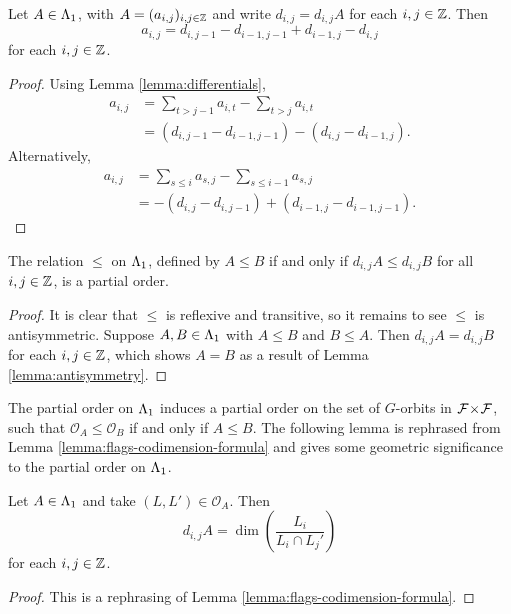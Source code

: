 \documentclass[a4paper, 11pt]{report}
\begin{document}
\begin{lemma}\label{lemma:antisymmetry}
Let $A\in{\Lambda_1}$, with $A = (a_{i,j})_{i,j\in\mathbb{Z}}$ and write $d_{i,j}=d_{i,j}A$ for each $i,j\in\mathbb{Z}$. Then
\begin{equation*}
a_{i,j} = d_{i,j-1} - d_{i-1,j-1} + d_{i-1,j} - d_{i,j}
\end{equation*}
for each $i,j\in\mathbb{Z}$.
\end{lemma}
\begin{proof}
Using Lemma \ref{lemma:differentials},
\begin{align*}
a_{i,j}
&= \sum_{t>j-1}a_{i,t} - \sum_{t>j}a_{i,t}\\
&= (d_{i,j-1} - d_{i-1,j-1}) - (d_{i,j} - d_{i-1,j}).
\end{align*}
Alternatively,
\begin{align*}
a_{i,j}
&= \sum_{s\le i}a_{s,j} - \sum_{s\le i-1}a_{s,j}\\
&= -(d_{i,j}-d_{i,j-1}) + (d_{i-1,j} - d_{i-1,j-1}).
\end{align*}
\end{proof}

\begin{lemma}\label{lemma:orbit-poset}
The relation $\le$ on ${\Lambda_1}$, defined by $A\le B$ if and only if $d_{i,j}A\le d_{i,j}B$ for all $i,j\in\mathbb{Z}$, is a partial order.
\end{lemma}

\begin{proof}
It is clear that $\le$ is reflexive and transitive, so it remains to see $\le$ is antisymmetric. Suppose $A,B\in{\Lambda_1}$ with $A\le B$ and $B\le A$. Then $d_{i,j}A = d_{i,j}B$ for each $i,j\in\mathbb{Z}$, which shows $A=B$ as a result of Lemma \ref{lemma:antisymmetry}.  
\end{proof}

The partial order on ${\Lambda_1}$ induces a partial order on the set of $G$-orbits in ${\mathcal{F}\!\times\!\mathcal{F}}$, such that $\mathcal{O}_A\le \mathcal{O}_B$ if and only if $A\le B$. The following lemma is rephrased from Lemma \ref{lemma:flags-codimension-formula} and gives some geometric significance to the partial order on ${\Lambda_1}$.

\begin{lemma}
Let $A\in{\Lambda_1}$ and take $(L,L')\in\mathcal{O}_A$. Then
\begin{equation*}
d_{i,j}A = \dim\left(\frac{L_i}{L_i\cap L_j'}\right)
\end{equation*}
for each $i,j\in\mathbb{Z}$.
\end{lemma}
\begin{proof}
This is a rephrasing of Lemma \ref{lemma:flags-codimension-formula}.
\end{proof}
\end{document}
